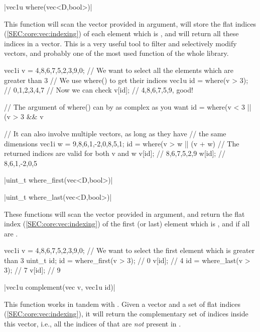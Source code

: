 \funcitem \cppinline|vec1u where(vec<D,bool>)| 

This function will scan the  vector provided in argument, will store the flat indices (\ref{SEC:core:vec:indexing}) of each element which is \cpptrue, and will return all these indices in a vector. This is a very useful tool to filter and selectively modify vectors, and probably one of the most used function of the whole library.

\begin{example}
\begin{cppcode}
vec1i v = {4,8,6,7,5,2,3,9,0};
// We want to select all the elements which are greater than 3
// We use where() to get their indices
vec1u id = where(v > 3); // {0,1,2,3,4,7}
// Now we can check
v[id]; // {4,8,6,7,5,9}, good!

// The argument of where() can by as complex as you want
id = where(v < 3 || (v > 3 && v %

// It can also involve multiple vectors, as long as they have
// the same dimensions
vec1i w = {9,8,6,1,-2,0,8,5,1};
id = where(v > w || (v + w) %
// The returned indices are valid for both v and w
v[id]; // {8,6,7,5,2,9}
w[id]; // {8,6,1,-2,0,5}
\end{cppcode}
\end{example}

\funcitem \cppinline|uint_t where_first(vec<D,bool>)| 

\cppinline|uint_t where_last(vec<D,bool>)| 

These functions will scan the  vector provided in argument, and return the flat index (\ref{SEC:core:vec:indexing}) of the first (or last) element which is \cpptrue, and  if all are \cppfalse.

\begin{example}
\begin{cppcode}
vec1i v = {4,8,6,7,5,2,3,9,0};
// We want to select the first element which is greater than 3
uint_t id;
id = where_first(v > 3); // 0
v[id];                   // 4
id = where_last(v > 3);  // 7
v[id];                   // 9
\end{cppcode}
\end{example}

\funcitem \cppinline|vec1u complement(vec v, vec1u id)| 

This function works in tandem with . Given a vector  and a set of flat indices  (\ref{SEC:core:vec:indexing}), it will return the complementary set of indices inside this vector, i.e., all the indices of  that are \emph{not} present in .

